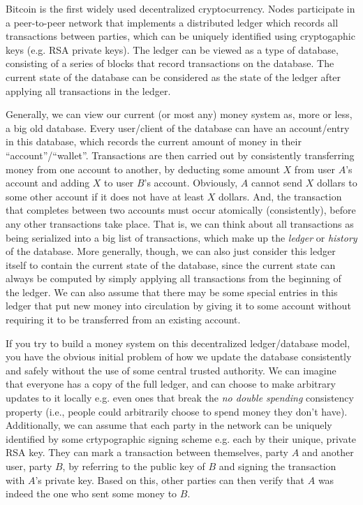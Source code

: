 \documentclass[10pt,a4paper]{article}
\begin{document}
Bitcoin \cite{nakamoto2009bitcoin} is the first widely used decentralized cryptocurrency. Nodes participate in a peer-to-peer network that implements a distributed ledger which records all transactions between parties, which can be uniquely identified using cryptogaphic keys (e.g. RSA private keys). The ledger can be viewed as a type of database, consisting of a series of blocks that record transactions on the database. The current state of the database can be considered as the state of the ledger after applying all transactions in the ledger.

Generally, we can view our current (or most any) money system as, more or less, a big old database. Every user/client of the database can have an account/entry in this database, which records the current amount of money in their ``account''/``wallet''. Transactions are then carried out by consistently transferring money from one account to another, by deducting some amount $X$ from user $A$'s account and adding $X$ to user $B$'s account. Obviously, $A$ cannot send $X$ dollars to some other account if it does not have at least $X$ dollars. And, the transaction that completes between two accounts must occur atomically (consistently), before any other transactions take place. That is, we can think about all transactions as being serialized into a big list of transactions, which make up the \textit{ledger} or \textit{history} of the database. More generally, though, we can also just consider this ledger itself to contain the current state of the database, since the current state can always be computed by simply applying all transactions from the beginning of the ledger. We can also assume that there may be some special entries in this ledger that put new money into circulation by giving it to some account without requiring it to be transferred from an existing account.

If you try to build a money system on this decentralized ledger/database model, you have the obvious initial problem of how we update the database consistently and safely without the use of some central trusted authority. We can imagine that everyone has a copy of the full ledger, and can choose to make arbitrary updates to it locally e.g. even ones that break the \textit{no double spending} consistency property (i.e., people could arbitrarily choose to spend money they don't have). Additionally, we can assume that each party in the network can be uniquely identified by some crtypographic signing scheme e.g. each by their unique, private RSA key. They can mark a transaction between themselves, party $A$ and another user, party $B$, by referring to the public key of $B$ and signing the transaction with $A$'s private key. Based on this, other parties can then verify that $A$ was indeed the one who sent some money to $B$.
\end{document}
